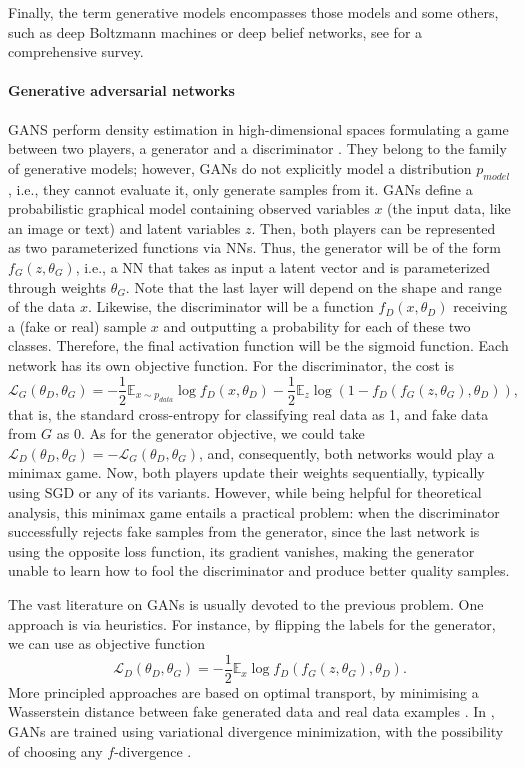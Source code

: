 Finally, the term generative models 
encompasses those models and some others, such as deep Boltzmann machines or deep belief networks, see \parencite{doi:10.1146/annurev-statistics-010814-020120} for a comprehensive survey.

\paragraph{Generative adversarial networks} GANS  perform density estimation in high-dimensional spaces formulating a game between two players, a generator and a discriminator \parencite{goodfellow2014generative}. They belong to the family of generative models; however, GANs do not explicitly model a distribution $p_{model}$, i.e., they cannot evaluate it, only generate samples from it.
GANs define a probabilistic graphical model containing observed variables $x$ (the input data, like an image or text) and latent variables $z$. Then, both players can be represented as two parameterized functions via NNs. Thus, the generator will be of the form $f_G(z, \theta_G)$, i.e., a NN that takes as input a latent vector and is parameterized through weights $\theta_G$. Note that the last layer will depend on the shape and range of the data $x$. Likewise, the discriminator will be a function $f_D(x, \theta_D)$ receiving a (fake or real) sample $x$ and outputting a probability for each of these two classes. Therefore, the final activation function will be 
the sigmoid function. Each network has its own objective function. For the discriminator, the cost is
$$
\mathcal{L}_G(\theta_D, \theta_G) = -\dfrac{1}{2} \mathbb{E}_{x \sim p_{data}} \log f_D(x, \theta_D) -\dfrac{1}{2} \mathbb{E}_z \log (1 - f_D(f_G(z, \theta_G), \theta_D)),
$$
that is, the standard cross-entropy for classifying real data as 1, and fake data from $G$ as 0. As for the generator objective, we could take $\mathcal{L}_D(\theta_D, \theta_G) = -\mathcal{L}_G(\theta_D, \theta_G)$,
and, consequently, both networks would play a minimax game.
Now, both players update their weights sequentially, typically using SGD or any of its variants.
However, while being helpful for theoretical analysis, 
this minimax game entails a practical problem: when the discriminator successfully rejects fake samples from the generator, since the last network is using the opposite loss function, its gradient vanishes, making the generator unable to learn how to fool the discriminator and produce better quality samples.

The vast literature on GANs is usually devoted to the previous problem. One approach is via heuristics. For instance, by flipping the labels for the generator, we can use as objective function
$$
\mathcal{L}_D(\theta_D, \theta_G) = -\dfrac{1}{2} \mathbb{E}_{x} \log f_D(f_G(z, \theta_G), \theta_D).
$$
More principled approaches are based on optimal transport, by minimising a Wasserstein distance between fake generated data and real data examples \parencite{arjovsky2017wasserstein}. In \parencite{nowozin2016f}, GANs are trained using variational divergence minimization, with the possibility of choosing any $f$-divergence \parencite{CIT-004}.

